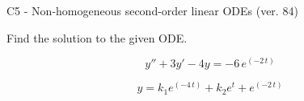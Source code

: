 \begin{exercise}
  \begin{exerciseTitle}C5 - Non-homogeneous second-order linear ODEs (ver. 84)\end{exerciseTitle}
  \begin{exerciseStatement}
    
Find the solution to the given ODE.

    
\[y''+3y'-4y = -6 \, e^{\left(-2 \, t\right)}\]

  \end{exerciseStatement}
  \begin{exerciseAnswer}
    
\[y= k_{1} e^{\left(-4 \, t\right)} + k_{2} e^{t} + e^{\left(-2 \, t\right)}\]

  \end{exerciseAnswer}
\end{exercise}